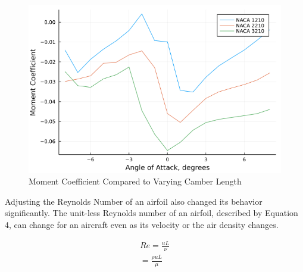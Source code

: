 \documentclass{article}
\begin{document}
\begin{figure}[!htb]
\endminipage\hfill
{}
  \includegraphics[width=\linewidth]{Figure6.png}
  \caption{Moment Coefficient Compared to Varying Camber Length}\label{fig:6}
\endminipage
\end{figure}

Adjusting the Reynolds Number of an airfoil also changed its behavior significantly. The unit-less Reynolds number of an airfoil, described by Equation 4, can change for an aircraft even as its velocity or the air density changes.

\begin{equation} \label{eq:4}
\begin{aligned}
        	Re = \frac{uL}{\nu} \\
	= \frac{\rho uL}{\mu} 
\end{aligned}
\end{equation}
\newline
\end{document}
